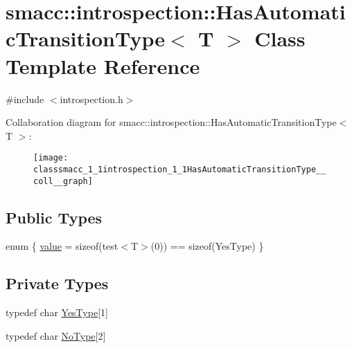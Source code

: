 \hypertarget{classsmacc_1_1introspection_1_1HasAutomaticTransitionType}{}\section{smacc\+:\+:introspection\+:\+:Has\+Automatic\+Transition\+Type$<$ T $>$ Class Template Reference}
\label{classsmacc_1_1introspection_1_1HasAutomaticTransitionType}


{\ttfamily \#include $<$introspection.\+h$>$}



Collaboration diagram for smacc\+:\+:introspection\+:\+:Has\+Automatic\+Transition\+Type$<$ T $>$\+:
\nopagebreak
\begin{figure}[H]
\begin{center}
\leavevmode
\texttt{[image: classsmacc\_1\_1introspection\_1\_1HasAutomaticTransitionType\_\_coll\_\_graph]}
\end{center}
\end{figure}
\subsection*{Public Types}
\begin{DoxyCompactItemize}
\item 
enum \{ \hyperlink{classsmacc_1_1introspection_1_1HasAutomaticTransitionType_ac663d77745eac0f2b2ceb29e4c8b300ba8aba42189dc17891761a49375684776d}{value} = sizeof(test$<$T$>$(0)) == sizeof(Yes\+Type)
 \}
\end{DoxyCompactItemize}
\subsection*{Private Types}
\begin{DoxyCompactItemize}
\item 
typedef char \hyperlink{classsmacc_1_1introspection_1_1HasAutomaticTransitionType_abeb599df547eb3db36684b6cb343eade}{Yes\+Type}\mbox{[}1\mbox{]}
\item 
typedef char \hyperlink{classsmacc_1_1introspection_1_1HasAutomaticTransitionType_aa2e976214fc770f53aaae67fc049caab}{No\+Type}\mbox{[}2\mbox{]}
\end{DoxyCompactItemize}
